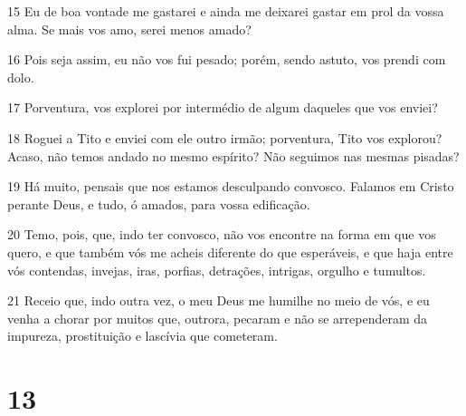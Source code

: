 \par 15 Eu de boa vontade me gastarei e ainda me deixarei gastar em prol da vossa alma. Se mais vos amo, serei menos amado?
\par 16 Pois seja assim, eu não vos fui pesado; porém, sendo astuto, vos prendi com dolo.
\par 17 Porventura, vos explorei por intermédio de algum daqueles que vos enviei?
\par 18 Roguei a Tito e enviei com ele outro irmão; porventura, Tito vos explorou? Acaso, não temos andado no mesmo espírito? Não seguimos nas mesmas pisadas?
\par 19 Há muito, pensais que nos estamos desculpando convosco. Falamos em Cristo perante Deus, e tudo, ó amados, para vossa edificação.
\par 20 Temo, pois, que, indo ter convosco, não vos encontre na forma em que vos quero, e que também vós me acheis diferente do que esperáveis, e que haja entre vós contendas, invejas, iras, porfias, detrações, intrigas, orgulho e tumultos.
\par 21 Receio que, indo outra vez, o meu Deus me humilhe no meio de vós, e eu venha a chorar por muitos que, outrora, pecaram e não se arrependeram da impureza, prostituição e lascívia que cometeram.

\chapter{13}

